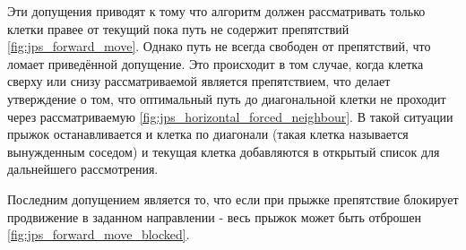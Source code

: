 {
\mybox[x=1,y=0,color=grey]
\mybox[x=1,y=1,color=grey]
\mybox[x=1,y=2,color=grey]
\mybox[x=2,y=1,color=green]

\mygrid[width=6, height=3]

\myarrow[startx=0,starty=1,endx=1,endy=1,color=darkgrey]
\myarrow[startx=1,starty=1,endx=2,endy=1,color=darkgrey]
\myarrow[startx=1,starty=1,endx=1,endy=2,color=blue]
\myarrow[startx=1,starty=1,endx=1,endy=0,color=blue]
}

{
	\mybox[x=1,y=0,color=grey]
	\mybox[x=1,y=1,color=grey]
	\mybox[x=1,y=2,color=grey]
	\mybox[x=2,y=0,color=grey]
	\mybox[x=2,y=2,color=grey]
	\mybox[x=2,y=1,color=green]
	
	\mygrid[width=6, height=3]
	
	\myarrow[startx=0,starty=1,endx=1,endy=1,color=darkgrey]
	\myarrow[startx=1,starty=1,endx=2,endy=1,color=darkgrey]
	\myarrow[startx=1,starty=1,endx=1,endy=2,color=darkgrey]
	\myarrow[startx=1,starty=1,endx=1,endy=0,color=darkgrey]
	\myarrow[startx=1,starty=1,endx=2,endy=2,color=blue]
	\myarrow[startx=1,starty=1,endx=2,endy=0,color=blue]
}

Эти допущения приводят к тому что алгоритм должен рассматривать только клетки правее от текущий пока путь не содержит препятствий \cref{fig:jps_forward_move}. Однако путь не всегда свободен от препятствий, что ломает приведённой допущение. Это происходит в том случае, когда клетка сверху или снизу рассматриваемой является препятствием, что делает утверждение о том, что оптимальный путь до диагональной клетки не проходит через рассматриваемую \cref{fig:jps_horizontal_forced_neighbour}. В такой ситуации прыжок останавливается и клетка по диагонали (такая клетка называется вынужденным соседом) и текущая клетка добавляются в открытый список для дальнейшего рассмотрения. 

Последним допущением является то, что если при прыжке препятствие блокирует продвижение в заданном направлении - весь прыжок может быть отброшен \cref{fig:jps_forward_move_blocked}.

